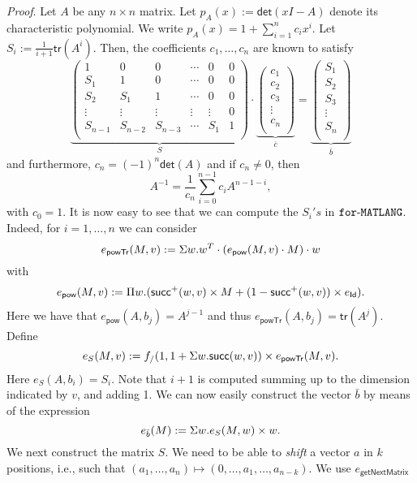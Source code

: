 \textit{Proof}. Let $A$ be any $n \times n$ matrix.
Let $p_A(x):=\mathsf{det}(xI-A)$ denote its characteristic polynomial.
We write $p_A(x)=1 + \sum_{i=1}^n c_ix^i$. Let $S_i:=\frac{1}{i+1}\mathsf{tr}(A^i)$. 
Then, the coefficients $c_1,\ldots,c_n$ are known to satisfy 
$$
\underbrace{\left(\begin{matrix}
1 & 0 & 0 & \cdots & 0 & 0\\
S_1 & 1 & 0 & \cdots  &0 & 0\\
S_2 & S_1 & 1 & \cdots  &0 & 0\\
\vdots & \vdots & \vdots & \vdots & \vdots & 0\\
S_{n-1} & S_{n-2} & S_{n-3} & \cdots & S_1 & 1\\
\end{matrix}\right)}_{S}\cdot
\underbrace{\left(\begin{matrix}
c_1\\
c_2\\
c_3\\
\vdots\\
c_n\\
\end{matrix}\right)}_{\bar c}=\underbrace{\left(\begin{matrix}
S_1\\
S_2\\
S_3\\
\vdots\\
S_n\\
\end{matrix}\right)}_{\bar b}
$$
and furthermore, $c_n=(-1)^n\mathsf{det}(A)$ and if $c_{n}\neq 0$, then
$$
A^{-1}=\frac{1}{c_n}\sum_{i=0}^{n-1}c_i A^{n-1-i},
$$
with $c_0=1$. It is now easy to see that we can compute the $S_i's$ in $\texttt{for}\text{-}\texttt{MATLANG}$. Indeed, for
$i=1,\ldots,n$ we can consider
$$
e_{\mathsf{powTr}}(M,v):=\Sigma w. w^T\cdot\left(e_{\mathsf{pow}}(M,v)\cdot M\right)\cdot w
$$
with 
$$
e_{\mathsf{pow}}(M,v):= \Pi w. (\mathsf{succ}^+(w,v)\times M+(1-\mathsf{succ}^+(w,v))\times e_{\mathsf{Id}}).
$$
Here we have that $e_{\mathsf{pow}}(A,b_j)=A^{j-1}$ and thus $e_{\mathsf{powTr}}(A,b_j)=\mathsf{tr}(A^j)$. Define 
$$
e_{S}(M,v):=f_{/}(1, 1 + \Sigma w. \mathsf{succ}(w,v))\times e_{\mathsf{powTr}}(M,v).
$$
Here $e_{S}(A,b_i)=S_i$. Note that $i+1$ is computed summing up to the dimension indicated by $v$, and adding 1.
We can now easily construct the vector $\bar b$ by means of the expression
$$
e_{\bar b}(M):=\Sigma w.e_{S}(M,w)\times w.
$$
We next construct the matrix $S$. We need to be able to \textit{shift} a vector $a$ in $k$ positions, i.e.,
such that $(a_1,\ldots,a_n)\mapsto (0,\ldots,a_1,\ldots,a_{n-k})$. We use $e_{\mathsf{getNextMatrix}}$ 
